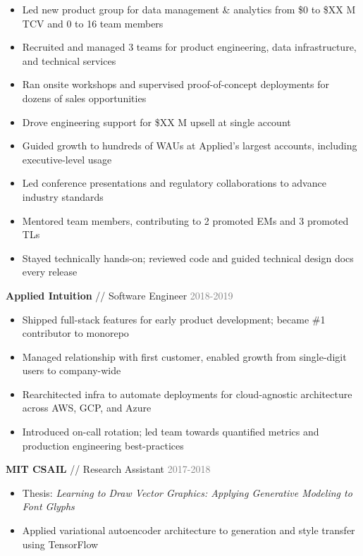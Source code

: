\documentclass[11pt]{article}
\newcommand{\bt}[1]{\textbf{#1}} %
\newcommand{\sep}[0]{ // } %
\newcommand{\gray}[1]{\textcolor{gray}{#1}}
\newcommand{\e}[0]{> }
\begin{document}
\begin{itemize}
\item[\e] Led new product group for data management \& analytics from \$0 to \$XX M TCV and 0 to 16 team members
\item[\e] Recruited and managed 3 teams for product engineering, data infrastructure, and technical services
\item[\e] Ran onsite workshops and supervised proof-of-concept deployments for dozens of sales opportunities
\item[\e] Drove engineering support for \$XX M upsell at single account
\item[\e] Guided growth to hundreds of WAUs at Applied's largest accounts, including executive-level usage
\item[\e] Led conference presentations and regulatory collaborations to advance industry standards
\item[\e] Mentored team members, contributing to 2 promoted EMs and 3 promoted TLs
\item[\e] Stayed technically hands-on; reviewed code and guided technical design docs every release
\end{itemize}

\bt{Applied Intuition}\sep Software Engineer \hfill \gray{2018-2019}

\begin{itemize}
\item[\e] Shipped full-stack features for early product development; became \#1 contributor to monorepo
\item[\e] Managed relationship with first customer, enabled growth from single-digit users to company-wide
\item[\e] Rearchitected infra to automate deployments for cloud-agnostic architecture across AWS, GCP, and Azure
\item[\e] Introduced on-call rotation; led team towards quantified metrics and production engineering best-practices
\end{itemize}


\bt{MIT CSAIL}\sep Research Assistant \hfill \gray{2017-2018}

\begin{itemize}
\item[\e] Thesis: \textit{Learning to Draw Vector Graphics: Applying Generative Modeling to Font Glyphs}
\item[\e] Applied variational autoencoder architecture to generation and style transfer using TensorFlow
\end{itemize}
\end{document}
